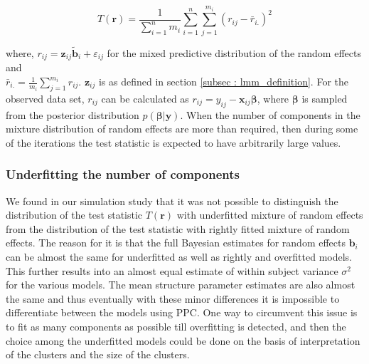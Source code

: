 \begin{equation}
\label{eq : ppc_test_statistic}
T(\boldsymbol{r}) = \frac 1 {\sum_{i=1}^n m_i} \sum_{i=1}^n \sum_{j=1}^{m_i} {(r_{ij}-\bar{r}_{i.})}^2
\end{equation}

where, $r_{ij} = \boldsymbol{z}_{ij}\boldsymbol{\tilde{b}}_i + \varepsilon_{ij}$ for the mixed predictive distribution of the random effects and\\ $\bar{r}_{i.} = \frac 1 {m_i} \sum_{j=1}^{m_i} r_{ij}$. $\boldsymbol{z}_{ij}$ is as defined in section \ref{subsec : lmm_definition}. For the observed data set, $r_{ij}$ can be calculated as $r_{ij} = y_{ij} - \boldsymbol{x}_{ij}\boldsymbol{\beta}$, where $\boldsymbol{\beta}$ is sampled from the posterior distribution $p(\boldsymbol{\beta}|\boldsymbol{y})$. When the number of components in the mixture distribution of random effects are more than required, then during some of the iterations the test statistic is expected to have arbitrarily large values.

\subsubsection{Underfitting the number of components}
We found in our simulation study that it was not possible to distinguish the distribution of the test statistic $T(\boldsymbol{r})$ with underfitted mixture of random effects from the distribution of the test statistic with rightly fitted mixture of random effects. The reason for it is that the full Bayesian estimates for random effects $\boldsymbol{b}_i$ can be almost the same for underfitted as well as rightly and overfitted models. This further results into an almost equal estimate of within subject variance $\sigma^2$ for the various models. The mean structure parameter estimates are also almost the same and thus eventually with these minor differences it is impossible to differentiate between the models using PPC. One way to circumvent this issue is to fit as many components as possible till overfitting is detected, and then the choice among the underfitted models could be done on the basis of interpretation of the clusters and the size of the clusters.
 
